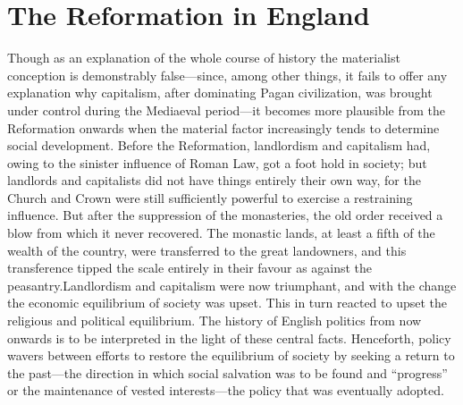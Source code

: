 \documentclass{book}
\begin{document}
\chapter{The Reformation in England}
\label{chapter-12}
Though as an explanation of the whole course of history the materialist conception is demonstrably false—since, among other things, it fails to offer any explanation why capitalism, after dominating Pagan civilization, was brought under control during the Mediaeval period—it becomes more plausible from the Reformation onwards when the material factor increasingly tends to determine social development. Before the Reformation, landlordism and capitalism had, owing to the sinister influence of Roman Law, got a foot hold in society; but landlords and capitalists did not have things entirely their own way, for the Church and Crown were still sufficiently powerful to exercise a restraining influence. But after the suppression of the monasteries, the old order received a blow from which it never recovered. The monastic lands, at least a fifth of the wealth of the country, were transferred to the great landowners, and this transference tipped the scale entirely in their favour as against the peasantry.\footnotemark[1] Landlordism and capitalism were now triumphant, and with the change the economic equilibrium of society was upset. This in turn reacted to upset the religious and political equilibrium. The history of English politics from now onwards is to be interpreted in the light of these central facts. Henceforth, policy wavers between efforts to restore the equilibrium of society by seeking a return to the past—the direction in which social salvation was to be found and “progress” or the maintenance of vested interests—the policy that was eventually adopted.
\end{document}
